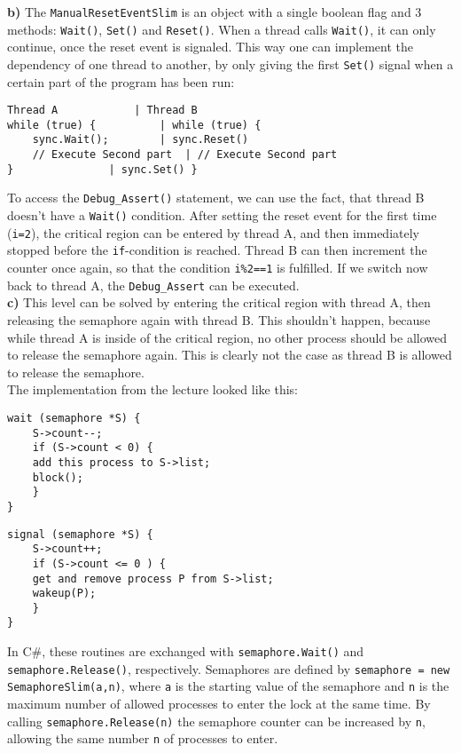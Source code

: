 \documentclass{article}
\begin{document}
\textbf{b)} The \texttt{ManualResetEventSlim} is an object with a single boolean
flag and 3 methods: \texttt{Wait()}, \texttt{Set()} and \texttt{Reset()}.
When a thread calls \texttt{Wait()}, it can only continue, once the reset event
is signaled. This way one can implement the dependency of one thread to another,
by only giving the first \texttt{Set()} signal when a certain part of the program
has been run:
\begin{lstlisting}
Thread A			| Thread B
while (true) {			| while (true) {
    sync.Wait();		| sync.Reset()
    // Execute Second part	| // Execute Second part
}				| sync.Set() }
\end{lstlisting}
To access the \texttt{Debug\_Assert()} statement, we can use the fact, that thread
B doesn't have a \texttt{Wait()} condition. After setting the reset event for the
first time (\texttt{i=2}), the critical region can be entered by thread A,
and then immediately stopped before the \texttt{if}-condition is reached. Thread
B can then increment the counter once again, so that the condition \texttt{i\%2==1}
is fulfilled. If we switch now back to thread A, the \texttt{Debug\_Assert} can be
executed. \\

\textbf{c)} This level can be solved by entering the critical region with thread A,
then releasing the semaphore again with thread B. This shouldn't happen, because
while thread A is inside of the critical region, no other process should be allowed
to release the semaphore again. This is clearly not the case as thread B is allowed
to release the semaphore. \\ The implementation from the lecture looked like this: \\
\begin{minipage}{.49\textwidth}
\begin{lstlisting}
wait (semaphore *S) {
    S->count--;
    if (S->count < 0) {
	add this process to S->list;
	block(); 
    }
}
\end{lstlisting}
\end{minipage}
\begin{minipage}{.49\textwidth}
\begin{lstlisting}
signal (semaphore *S) {
    S->count++;
    if (S->count <= 0 ) {
	get and remove process P from S->list;
	wakeup(P);
    }
}
\end{lstlisting}
\end{minipage}
In C\#, these routines are exchanged with \texttt{semaphore.Wait()} and
\texttt{semaphore.Release()}, respectively.
Semaphores are defined by \texttt{semaphore = new SemaphoreSlim(a,n)}, where
\texttt{a} is the starting value of the semaphore and \texttt{n} is the maximum number of
allowed processes to enter the lock at the same time.
By calling \texttt{semaphore.Release(n)} the semaphore counter can be increased by
\texttt{n}, allowing the same number \texttt{n} of processes to enter. \\
\end{document}
